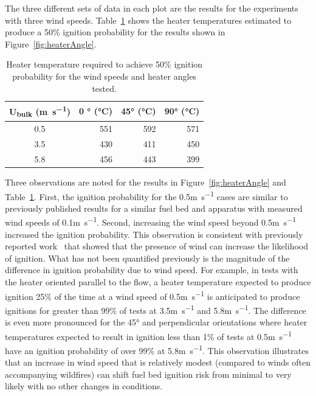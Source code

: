     The three different sets of data in each plot are the results for the experiments with three wind speeds. Table~\ref{tab:fiftyTemp} shows the heater temperatures estimated to produce a 50\% ignition probability for the results shown in Figure~\ref{fig:heaterAngle}.
            \begin{table}[hpbt]
                \normalsize
                \caption{Heater temperature required to achieve 50\% ignition probability for the wind speeds and heater angles tested.}
                \centering
                \begin{tabular}{crrr}
                    \rowcolor{gray!50}
                   U\textsubscript{bulk} (\si{\meter\per\second}) & 0 \si{\degree} (\si{\celsius}) & 45\si{\degree} (\si{\celsius}) & 90\si{\degree} (\si{\celsius})\\
                    \hline
                    0.5  & 551 & 592 & 571\\
                    3.5  & 430 & 411 & 450\\
                    5.8  & 456 & 443 & 399
                \end{tabular}
                \label{tab:fiftyTemp}
            \end{table}
    Three observations are noted for the results in Figure~\ref{fig:heaterAngle} and Table~\ref{tab:fiftyTemp}. 
    First, the ignition probability for the 0.5\si{\meter\per\second} cases are similar to previously published results for a similar fuel bed and apparatus with measured wind speeds of 0.1\si{\meter\per\second}\cite{Bean2021}. Second, increasing the wind speed beyond 0.5\si{\meter\per\second} increased the ignition probability. This observation is consistent with previously reported work~\cite{Ganteaume2009, Matvienko2018} that showed that the presence of wind can increase the likelihood of ignition. What has not been quantified previously is the magnitude of the difference in ignition probability due to wind speed. For example, in tests with the heater oriented parallel to the flow, a heater temperature expected to produce ignition 25\% of the time at a wind speed of 0.5\si{\meter\per\second} is anticipated to produce ignitions for greater than 99\% of tests at 3.5\si{\meter\per\second} and 5.8\si{\meter\per\second}. The difference is even more pronounced for the 45\si{\degree} and perpendicular orientations where heater temperatures expected to result in ignition less than 1\% of tests at 0.5\si{\meter\per\second} have an ignition probability of over 99\% at 5.8\si{\meter\per\second}. This observation illustrates that an increase in wind speed that is relatively modest (compared to winds often accompanying wildfires) can shift fuel bed ignition risk from minimal to very likely with no other changes in conditions.
    
